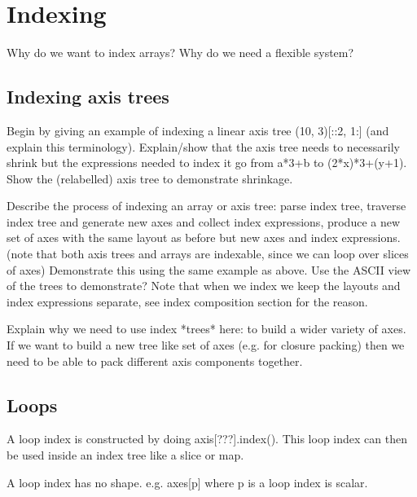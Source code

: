\documentclass[thesis]{subfiles}
\begin{document}

\chapter{Indexing}

Why do we want to index arrays? Why do we need a flexible system?

\section{Indexing axis trees}

Begin by giving an example of indexing a linear axis tree (10, 3)[::2, 1:] (and explain this terminology).
Explain/show that the axis tree needs to necessarily shrink but the expressions needed to index it go from a*3+b to (2*x)*3+(y+1).
Show the (relabelled) axis tree to demonstrate shrinkage.

Describe the process of indexing an array or axis tree: parse index tree, traverse index tree and generate new axes and collect index expressions, produce a new set of axes with the same layout as before but new axes and index expressions.
(note that both axis trees and arrays are indexable, since we can loop over slices of axes)
Demonstrate this using the same example as above.
Use the ASCII view of the trees to demonstrate?
Note that when we index we keep the layouts and index expressions separate, see index composition section for the reason.

Explain why we need to use index *trees* here: to build a wider variety of axes.
If we want to build a new tree like set of axes (e.g. for closure packing) then we need to be able to pack different axis components together.

\section{Loops}


A loop index is constructed by doing axis[???].index().
This loop index can then be used inside an index tree like a slice or map.

A loop index has no shape. e.g. axes[p] where p is a loop index is scalar.
\end{document}
